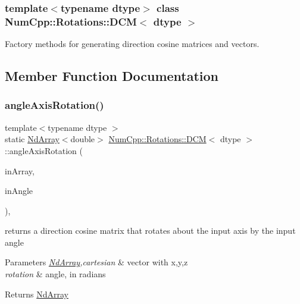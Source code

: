 \subsubsection*{template$<$typename dtype$>$\newline
class Num\+Cpp\+::\+Rotations\+::\+D\+C\+M$<$ dtype $>$}

Factory methods for generating direction cosine matrices and vectors. 

\subsection{Member Function Documentation}
\mbox{\label{class_num_cpp_1_1_rotations_1_1_d_c_m_a3d75bbc08842f49beeb41be7eb1f7c1b}} 
\subsubsection{\texorpdfstring{angle\+Axis\+Rotation()}{angleAxisRotation()}}
{\footnotesize\ttfamily template$<$typename dtype $>$ \\
static \mbox{\hyperlink{class_num_cpp_1_1_nd_array}{Nd\+Array}}$<$double$>$ \mbox{\hyperlink{class_num_cpp_1_1_rotations_1_1_d_c_m}{Num\+Cpp\+::\+Rotations\+::\+D\+CM}}$<$ dtype $>$\+::angle\+Axis\+Rotation (\begin{DoxyParamCaption}\item[{const \mbox{\hyperlink{class_num_cpp_1_1_nd_array}{Nd\+Array}}$<$ dtype $>$ \&}]{in\+Array,  }\item[{double}]{in\+Angle }\end{DoxyParamCaption})\hspace{0.3cm}{\ttfamily [inline]}, {\ttfamily [static]}}

returns a direction cosine matrix that rotates about the input axis by the input angle


\begin{DoxyParams}{Parameters}
{\em \mbox{\hyperlink{class_num_cpp_1_1_nd_array}{Nd\+Array}},cartesian} & vector with x,y,z \\
\hline
{\em rotation} & angle, in radians \\
\hline
\end{DoxyParams}
\begin{DoxyReturn}{Returns}
\mbox{\hyperlink{class_num_cpp_1_1_nd_array}{Nd\+Array}} 
\end{DoxyReturn}
\mbox{\label{class_num_cpp_1_1_rotations_1_1_d_c_m_a2173648fd6088e1ef98de97f7131cbac}} 
